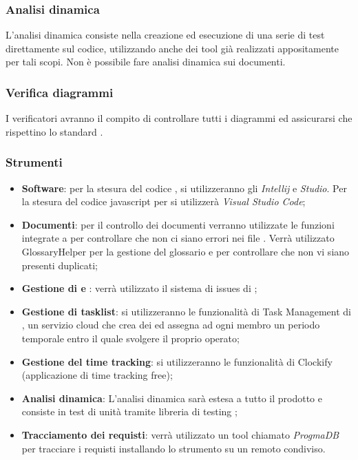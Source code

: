 \subsubsection{Analisi dinamica}
L’analisi dinamica consiste nella creazione ed esecuzione di una serie di test direttamente sul codice, utilizzando anche dei tool già realizzati appositamente per tali scopi. Non è possibile fare analisi dinamica sui documenti.
\subsubsection{Verifica diagrammi }
I verificatori avranno il compito di controllare tutti i diagrammi  ed assicurarsi che rispettino lo standard .



\subsubsection{Strumenti}
\begin{itemize}
    \item \textbf{Software}:  per la stesura del codice , si utilizzeranno gli  \emph{Intellij } e \emph{ Studio}. Per la stesura del codice javascript per  si utilizzerà \emph{Visual Studio Code};
    \item \textbf{Documenti}: per il controllo dei documenti verranno utilizzate le funzioni integrate a  per controllare che non ci siano errori nei file . Verrà utilizzato GlossaryHelper per la gestione del glossario e per controllare che non vi siano presenti duplicati;
    \item \textbf{Gestione di  e }: verrà utilizzato il sistema di issues di ;
    \item \textbf{Gestione di tasklist}: si utilizzeranno le funzionalità di Task Management di , un servizio cloud che crea dei  ed assegna ad ogni membro un periodo temporale entro il quale svolgere il proprio operato;
    \item \textbf{Gestione del time tracking}: si utilizzeranno le funzionalità di Clockify (applicazione di time tracking free);
    \item \textbf{Analisi dinamica}: L'analisi dinamica sarà estesa a tutto il  prodotto e consiste in test di unità tramite libreria di testing ;
    \item \textbf{Tracciamento dei requisti}: verrà utilizzato un tool chiamato \emph{ProgmaDB} per tracciare i requisti installando lo strumento su un  remoto condiviso.
\end{itemize}
